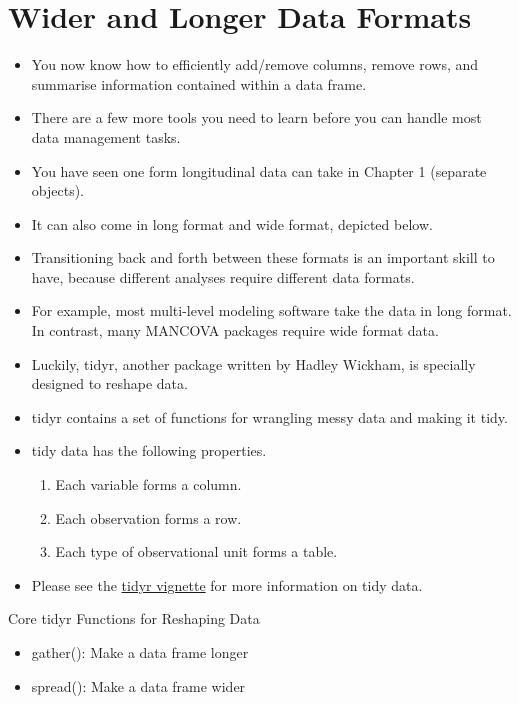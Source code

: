 \documentclass[]{book}
\providecommand{\tightlist}{%
  \setlength{\itemsep}{0pt}\setlength{\parskip}{0pt}}
\theoremstyle{definition}
\theoremstyle{definition}
\theoremstyle{definition}
\theoremstyle{remark}
\begin{document}
\hypertarget{wider-and-longer-data-formats}{%
\chapter{Wider and Longer Data Formats}\label{wider-and-longer-data-formats}}

\begin{itemize}
\item
  You now know how to efficiently add/remove columns, remove rows, and summarise information contained within a data frame.
\item
  There are a few more tools you need to learn before you can handle most data management tasks.
\item
  You have seen one form longitudinal data can take in Chapter 1 (separate objects).
\item
  It can also come in long format and wide format, depicted below.
\item
  Transitioning back and forth between these formats is an important skill to have, because different analyses require different data formats.
\item
  For example, most multi-level modeling software take the data in long format. In contrast, many MANCOVA packages require wide format data.
\item
  Luckily, tidyr, another package written by Hadley Wickham, is specially designed to reshape data.
\item
  tidyr contains a set of functions for wrangling messy data and making it tidy.
\item
  tidy data has the following properties.

  \begin{enumerate}
  \def\labelenumi{\arabic{enumi}.}
  \tightlist
  \item
    Each variable forms a column.
  \item
    Each observation forms a row.
  \item
    Each type of observational unit forms a table.
  \end{enumerate}
\item
  Please see the \href{https://cran.r-project.org/web/packages/tidyr/vignettes/tidy-data.html}{tidyr vignette} for more information on tidy data.
\end{itemize}

Core tidyr Functions for Reshaping Data

\begin{itemize}
\tightlist
\item
  gather(): Make a data frame longer
\item
  spread(): Make a data frame wider
\end{itemize}
\end{document}
